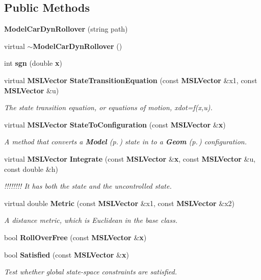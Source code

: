 \subsection*{Public Methods}
\begin{CompactItemize}
\item 
{\bf Model\-Car\-Dyn\-Rollover} (string path)
\item 
virtual {\bf $\sim$Model\-Car\-Dyn\-Rollover} ()
\item 
int {\bf sgn} (double {\bf x})
\item 
virtual {\bf MSLVector} {\bf State\-Transition\-Equation} (const {\bf MSLVector} \&x1, const {\bf MSLVector} \&u)
\begin{CompactList}\small\item\em The state transition equation, or equations of motion, xdot=f(x,u).\item\end{CompactList}\item 
virtual {\bf MSLVector} {\bf State\-To\-Configuration} (const {\bf MSLVector} \&{\bf x})
\begin{CompactList}\small\item\em A method that converts a {\bf Model} {\rm (p.\,\pageref{classModel})} state in to a {\bf Geom} {\rm (p.\,\pageref{classGeom})} configuration.\item\end{CompactList}\item 
virtual {\bf MSLVector} {\bf Integrate} (const {\bf MSLVector} \&{\bf x}, const {\bf MSLVector} \&u, const double \&h)
\begin{CompactList}\small\item\em !!!!!!!! It has both the state and the uncontrolled state.\item\end{CompactList}\item 
virtual double {\bf Metric} (const {\bf MSLVector} \&x1, const {\bf MSLVector} \&x2)
\begin{CompactList}\small\item\em A distance metric, which is Euclidean in the base class.\item\end{CompactList}\item 
bool {\bf Roll\-Over\-Free} (const {\bf MSLVector} \&{\bf x})
\item 
bool {\bf Satisfied} (const {\bf MSLVector} \&{\bf x})
\begin{CompactList}\small\item\em Test whether global state-space constraints are satisfied.\item\end{CompactList}\end{CompactItemize}
